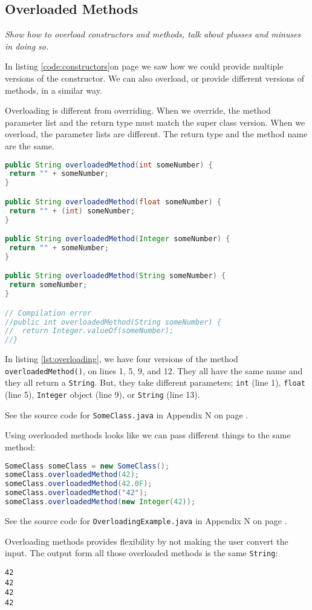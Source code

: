 \subsection{Overloaded Methods}
\textit{Show how to overload constructors and methods, talk about plusses and minuses in doing so.}

In listing \ref{code:constructors}on page \pageref{code:constructors} we saw how we could provide multiple versions of the constructor. We can also overload, or provide different versions of methods, in a similar way.

Overloading is different from overriding. When we override, the method parameter list and the return type must match the super class version. When we overload, the parameter lists are different. The return type and the method name are the same.

\begin{lstlisting}[language=Java, label=lst:overloading]
public String overloadedMethod(int someNumber) {
 return "" + someNumber;
}

public String overloadedMethod(float someNumber) {
 return "" + (int) someNumber;
}

public String overloadedMethod(Integer someNumber) {
 return "" + someNumber;
}

public String overloadedMethod(String someNumber) {
 return someNumber;
}

// Compilation error
//public int overloadedMethod(String someNumber) {
//  return Integer.valueOf(someNumber);
//}
\end{lstlisting}

In listing \ref{lst:overloading}, we have four versions of the method \texttt{overloadedMethod()}, on lines 1, 5, 9, and 12. They all have the same name and they all return a \texttt{String}. But, they take different parameters; \texttt{int} (line 1), \texttt{float} (line 5), \texttt{Integer} object (line 9), or \texttt{String} (line 13).

See the source code for \texttt{SomeClass.java} in Appendix N on page \pageref{App:AppendixN}.

Using overloaded methods looks like we can pass different things to the same method:
\begin{lstlisting}[language=Java]
SomeClass someClass = new SomeClass();
someClass.overloadedMethod(42);
someClass.overloadedMethod(42.0F);
someClass.overloadedMethod("42");
someClass.overloadedMethod(new Integer(42));
\end{lstlisting}

See the source code for \texttt{OverloadingExample.java} in Appendix N on page \pageref{App:AppendixN}.

Overloading methods provides flexibility by not making the user convert the input. The output form all those overloaded methods is the same \texttt{String}:
\begin{lstlisting}
42
42
42
42
\end{lstlisting}